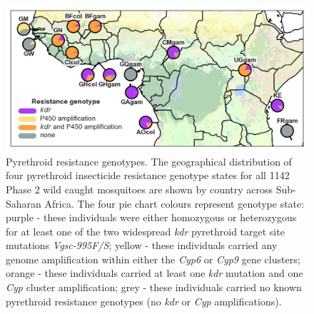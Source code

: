 \documentclass[a4paper,11pt,abstracton,hidelinks]{scrartcl}
\begin{document}
\begin{figure}[H]
	\begin{center}
		\includegraphics*[width=6.3in]{artwork/pyrethroid_resistance_simplified.jpg}
	\end{center}
	\caption{Pyrethroid resistance genotypes. The geographical distribution of four pyrethroid insecticide resistance genotype states for all 1142 Phase 2 wild caught mosquitoes are shown by country across Sub-Saharan Africa. The four pie chart colours represent genotype state: purple - these individuals were either homozygous or heterozygous for at least one of the two widespread \textit{kdr} pyrethroid target site mutations \textit{Vgsc-995F/S}; yellow - these individuals carried any genome amplification within either the \textit{Cyp6} or \textit{Cyp9} gene clusters; orange - these individuals carried at least one \textit{kdr} mutation and one \textit{Cyp} cluster amplification; grey - these individuals carried no known pyrethroid resistance genotypes (no \textit{kdr} or \textit{Cyp} amplifications).}
	\label{ir}
\end{figure}
\end{document}
